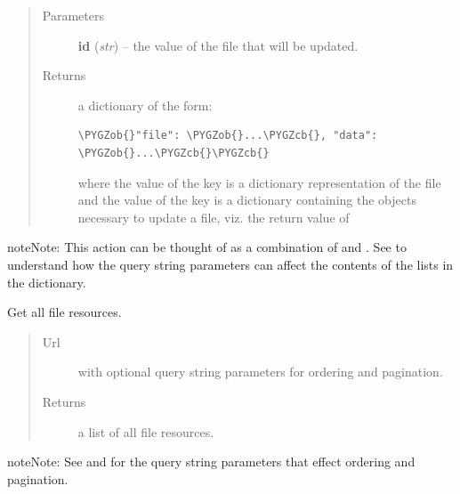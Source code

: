\documentclass[letterpaper,10pt,english]{sphinxmanual}
\def\PYGZob{\char`\{}
\def\PYGZcb{\char`\}}
\begin{document}
\begin{fulllineitems}
\begin{fulllineitems}
\begin{quote}
\begin{description}
\item[{Parameters}] \leavevmode
\textbf{id} (\emph{str}) -- the  value of the file that will be updated.

\item[{Returns}] \leavevmode

a dictionary of the form:

\begin{Verbatim}[commandchars=\\\{\}]
\PYGZob{}"file": \PYGZob{}...\PYGZcb{}, "data": \PYGZob{}...\PYGZcb{}\PYGZcb{}
\end{Verbatim}

where the value of the  key is a dictionary representation
of the file and the value of the  key is a dictionary
containing the objects necessary to update a file, viz. the return
value of 


\end{description}\end{quote}

\begin{notice}{note}{Note:}
This action can be thought of as a combination of
 and .  See
 to understand how the query string
parameters can affect the contents of the lists in the 
dictionary.
\end{notice}

\end{fulllineitems}


\begin{fulllineitems}
\label{api:onlinelinguisticdatabase.controllers.files.FilesController.index}
Get all file resources.
\begin{quote}\begin{description}
\item[{Url }] \leavevmode
{} with optional query string parameters for ordering
and pagination.

\item[{Returns}] \leavevmode
a list of all file resources.

\end{description}\end{quote}

\begin{notice}{note}{Note:}
See  and  for the
query string parameters that effect ordering and pagination.
\end{notice}


\end{fulllineitems}
\end{fulllineitems}
\end{document}
